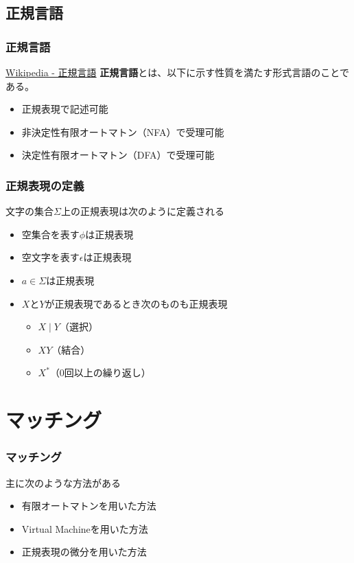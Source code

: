 \documentclass[12pt, unicode, svgnames]{beamer}
\begin{document}
\subsection{正規言語}
\begin{frame}[fragile]
  \frametitle{正規言語}

  \begin{block}{}
    \begin{shadequote}[r]{\scriptsize\href{https://ja.wikipedia.org/wiki/\%E6\%AD\%A3\%E8\%A6\%8F\%E8\%A8\%80\%E8\%AA\%9E}{Wikipedia - 正規言語}}
      \textbf{正規言語}とは、以下に示す性質を満たす形式言語のことである。
      \begin{itemize}
        \item<2-> 正規表現で記述可能
        \item<3-> 非決定性有限オートマトン（NFA）で受理可能
        \item<4-> 決定性有限オートマトン（DFA）で受理可能
      \end{itemize}
    \end{shadequote}
  \end{block}
\end{frame}

\begin{frame}[fragile]
  \frametitle{正規表現の定義}

  文字の集合$\Sigma$上の正規表現は次のように定義される
  \begin{block}{}
    \begin{itemize}
      \item<2-> 空集合を表す$\phi$は正規表現
      \item<3-> 空文字を表す$\epsilon$は正規表現
      \item<4-> $a \in \Sigma$は正規表現
      \item<5-> $X$と$Y$が正規表現であるとき次のものも正規表現
        \begin{itemize}
          \item<6-> $X \mid Y$（選択）
          \item<7-> $X Y$（結合）
          \item<8-> $X^*$（0回以上の繰り返し）
        \end{itemize}
    \end{itemize}
  \end{block}
\end{frame}

\section{マッチング}
\begin{frame}[fragile]
  \frametitle{マッチング}

  主に次のような方法がある
  \begin{itemize}
    \item<2-> 有限オートマトンを用いた方法
    \item<3-> Virtual Machineを用いた方法
    \item<4-> 正規表現の微分を用いた方法
  \end{itemize}
\end{frame}
\end{document}
